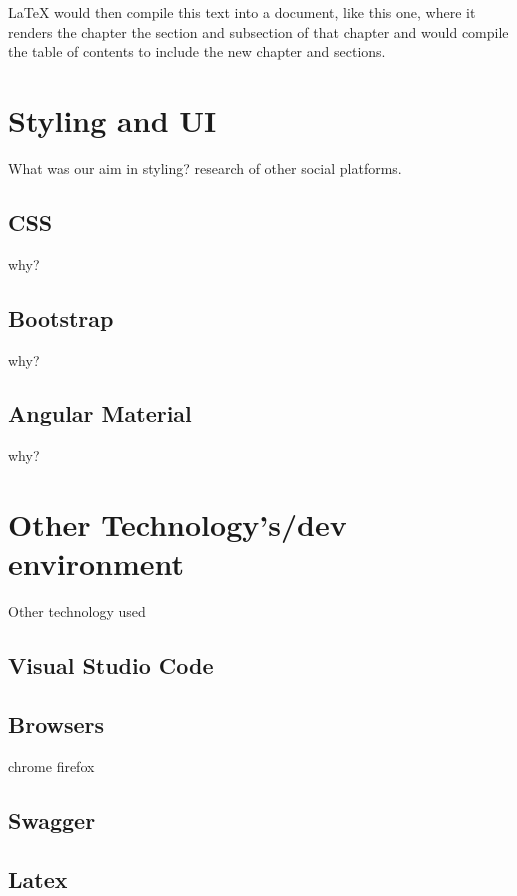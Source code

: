 LaTeX would then compile this text into a document, like this one, where it renders the chapter the section and subsection of that chapter and would compile the table of contents to include the new chapter and sections.

\section{Styling and UI}
What was our aim in styling? research of other social platforms.

\subsection{CSS}
why?

\subsection{Bootstrap}
why?

\subsection{Angular Material}
why?

\section{Other Technology's/dev environment}
Other technology used
\subsection{Visual Studio Code}
\subsection{Browsers}
chrome firefox
\subsection{Swagger}
\subsection{Latex}



